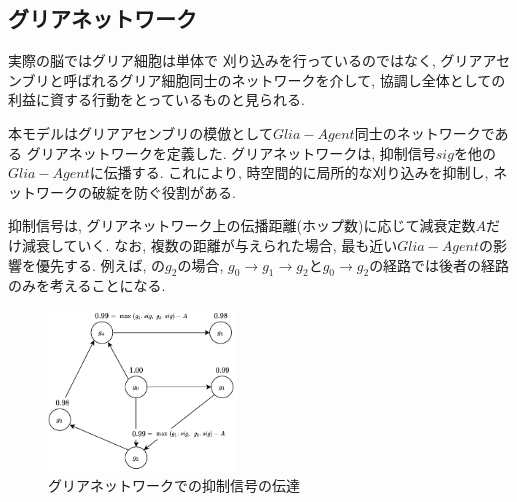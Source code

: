 \documentclass[a4paper,9pt,twocolumn]{jsarticle}
\begin{document}
\subsection{グリアネットワーク}
実際の脳ではグリア細胞は単体で
刈り込みを行っているのではなく, 
グリアアセンブリと呼ばれるグリア細胞同士のネットワークを介して, 
協調し全体としての利益に資する行動をとっているものと見られる.

本モデルはグリアアセンブリの模倣として$Glia-Agent$同士のネットワークである
グリアネットワークを定義した.
グリアネットワークは, 抑制信号$sig$を他の$Glia-Agent$に伝播する.
これにより, 時空間的に局所的な刈り込みを抑制し, ネットワークの破綻を防ぐ役割がある.

抑制信号は, グリアネットワーク上の伝播距離(ホップ数)に応じて減衰定数$A$だけ減衰していく.
なお, 複数の距離が与えられた場合, 最も近い$Glia-Agent$の影響を優先する.
例えば, の$g_2$の場合, 
$g_0\rightarrow g_1\rightarrow g_2$と$g_0\rightarrow g_2$の経路では後者の経路のみを考えることになる.

\begin{figure}[H]
  \centering
  \includegraphics[width=5cm]{GliaNetworks.pdf}
  \caption{グリアネットワークでの抑制信号の伝達}
  \label{fig:GliaNetworks}
\end{figure}
\end{document}
